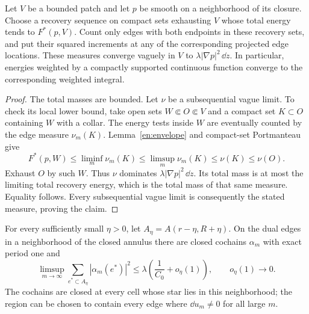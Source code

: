 \begin{lemma}\label{en:recovery-measures}
Let $V$ be a bounded patch and let $p$ be smooth on a neighborhood of its
closure.  Choose a recovery sequence on compact sets exhausting $V$
whose total energy tends to $F^*(p,V)$.  Count only edges with both
endpoints in these recovery sets, and put their squared increments
at any of the corresponding projected edge locations.  These measures
converge vaguely in $V$ to $\lambda|\nabla p|^2\,\dd z$.  In particular,
energies weighted by a compactly supported continuous function converge
to the corresponding weighted integral.
\end{lemma}

\begin{proof}
The total masses are bounded.  Let $\nu$ be a subsequential vague limit.
To check its local lower bound, take open sets $W\Subset O\Subset V$
and a compact set $K\subset O$ containing $W$ with a collar.  The energy
tests inside $W$ are eventually counted by the edge measure $\nu_m(K)$.
Lemma~\ref{en:envelope} and compact-set Portmanteau give
\[
 F^*(p,W)\le\liminf_m\nu_m(K)
          \le\limsup_m\nu_m(K)\le\nu(K)\le\nu(O).
\]
Exhaust $O$ by such $W$.  Thus $\nu$ dominates
$\lambda|\nabla p|^2\,\dd z$.  Its total mass is at most the limiting
total recovery energy, which is the total mass of that same measure.
Equality follows.  Every subsequential vague limit is consequently the
stated measure, proving the claim.
\end{proof}

\begin{lemma}\label{en:angular-recovery}
For every sufficiently small $\eta>0$, let
$A_\eta=A(r-\eta,R+\eta)$.  On the dual edges in a neighborhood of the
closed annulus there are closed cochains $\alpha_m$ with exact period
one and
\begin{equation}\label{en:angular-energy}
 \limsup_{m\to\infty}\sum_{e^*\subset A_\eta}|\alpha_m(e^*)|^2
 \le\lambda\left(\frac1{C_0}+o_\eta(1)\right),
             \qquad o_\eta(1)\longrightarrow0.
\end{equation}
The cochains are closed at every cell whose star lies in this
neighborhood; the region can be chosen to contain every edge where
$\dd u_m\ne0$ for all large $m$.
\end{lemma}

